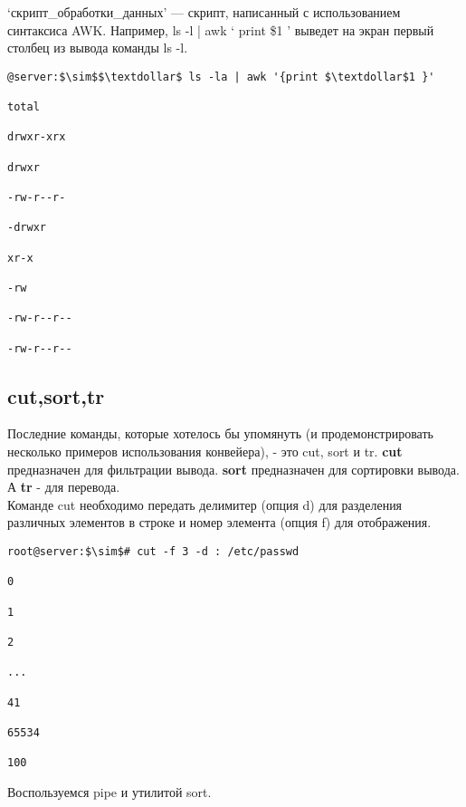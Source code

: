 \documentclass[14pt, a4paper]{article}
\begin{document}
\colorbox{backcolour}{‘{скрипт\_обработки\_данных}’} — скрипт, написанный с использованием синтаксиса AWK.
Например, \colorbox{backcolour}{ls -l | awk ‘{ print \$1 }’} выведет на экран первый столбец из вывода команды ls -l.

\vspace{0.3cm}

\begin{lstlisting}
@server:$\sim$$\textdollar$ ls -la | awk '{print $\textdollar$1 }'

total

drwxr-xrx

drwxr

-rw-r--r-

-drwxr

xr-x

-rw

-rw-r--r--

-rw-r--r--

\end{lstlisting}

\subsection*{cut,sort,tr} 

Последние команды, которые хотелось бы упомянуть (и продемонстрировать несколько примеров
использования конвейера), - это cut, sort и tr. \textbf{cut} предназначен для фильтрации вывода. \textbf{sort}
предназначен для сортировки вывода. А \textbf{tr} - для перевода.\\

Команде cut необходимо передать делимитер (опция d) для разделения различных элементов в
строке и номер элемента (опция f) для отображения.
\vspace{0.3cm}

\begin{lstlisting}
root@server:$\sim$# cut -f 3 -d : /etc/passwd

0

1

2

...

41

65534

100

\end{lstlisting}
\vspace{0.2cm}

Воспользуемся pipe и утилитой sort.
\end{document}
